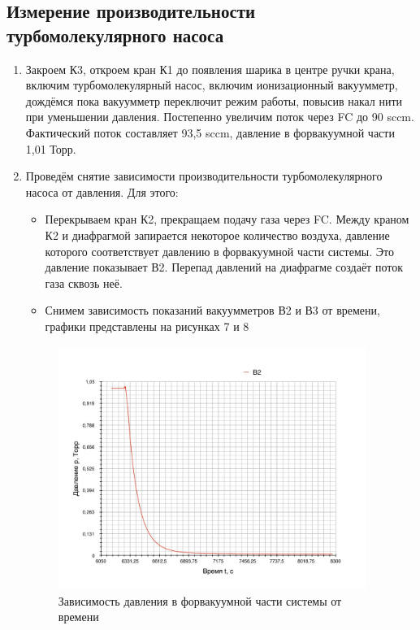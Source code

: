 \documentclass{article}
\begin{document}
\subsection{Измерение производительности турбомолекулярного насоса}

\begin{enumerate}
\item Закроем К3, откроем кран К1 до появления шарика в центре ручки крана, включим турбомолекулярный насос, включим ионизационный вакуумметр, дождёмся пока вакуумметр переключит режим работы, повысив накал нити при уменьшении давления. Постепенно увеличим поток через FC до 90 sccm. Фактический поток составляет 93,5 sccm, давление в форвакуумной части 1,01 Торр.
\item Проведём снятие зависимости производительности турбомолекулярного насоса от давления. Для этого:
\begin{itemize}
  \item Перекрываем кран К2, прекращаем подачу газа через FC. Между краном К2 и диафрагмой запирается некоторое количество воздуха, давление которого соответствует давлению в форвакуумной части системы. Это давление показывает В2. Перепад давлений на диафрагме создаёт поток газа сквозь неё.
  \item Снимем зависимость показаний вакуумметров В2 и В3 от времени, графики представлены на рисунках 7 и 8
\end{itemize}  

  \begin{figure}[H]
    \centering
    \includegraphics[width=10cm]{b2_end.jpg}
    \caption{Зависимость давления в форвакуумной части системы от времени}
    \label{fig:vac}
\end{figure}


\end{enumerate}
\end{document}
